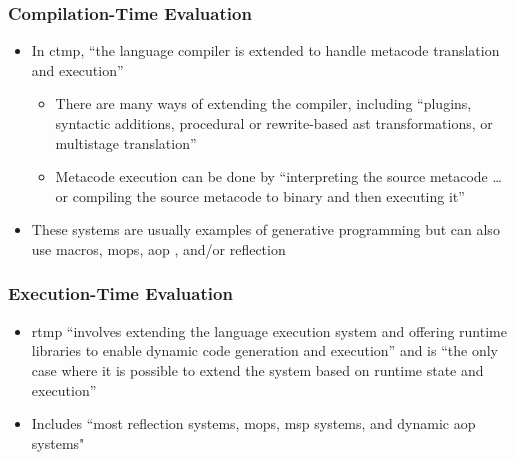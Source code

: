 \subsubsection{Compilation-Time Evaluation \citep[p.~113:21-23]{lilis_survey_2019}}
\begin{itemize}
      \item In \acf{ctmp}, ``the language compiler is extended to handle
            metacode translation and execution'' \citep[p.~113:22]{lilis_survey_2019}
            \begin{itemize}
                  \item There are many ways of extending the compiler,
                        including ``plugins, syntactic additions, procedural or
                        rewrite-based \acs{ast} transformations, or multistage
                        translation'' \citep[p.~113:22]{lilis_survey_2019}
                  \item Metacode execution can be done by ``interpreting the
                        source metacode \dots or compiling the source metacode
                        to binary and then executing it''
                        \citep[p.~113:22]{lilis_survey_2019}
            \end{itemize}
      \item These systems are usually examples of generative programming but
            can also use macros, \acsp{mop}, \acs{aop}
            \citep[p.~113:22]{lilis_survey_2019}, and/or reflection
            \citep[p.~113:23]{lilis_survey_2019}
\end{itemize}

\subsubsection{Execution-Time Evaluation \citep[p.~113:23-25]{lilis_survey_2019}}
\begin{itemize}
      \item \acf{rtmp} ``involves extending the language execution system and
            offering runtime libraries to enable dynamic code generation and
            execution'' and is ``the only case where it is possible to extend the
            system based on runtime state and execution''
            \citep[p.~113:23]{lilis_survey_2019}
      \item Includes ``most reflection systems, \acsp{mop}, \acs{msp} systems,
            and dynamic \acs{aop} systems" \citep[p.~113:31]{lilis_survey_2019}
\end{itemize}

